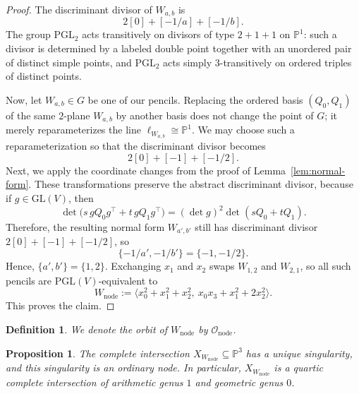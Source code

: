 \documentclass[11pt]{article}
\newtheorem{proposition}[theorem]{Proposition}
\newtheorem{definition}[theorem]{Definition}
\newcommand{\Pj}{\mathbb P}
\newcommand{\PGL}{\mathrm{PGL}}
\newcommand{\GL}{\mathrm{GL}}
\begin{document}
\begin{proof}
The discriminant divisor of $W_{a,b}$ is
\[
2[0]+[-1/a]+[-1/b].
\]
The group $\PGL_2$ acts transitively on divisors of type $2+1+1$ on $\Pj^1$: such a divisor is determined by a labeled double point together with an unordered pair of distinct simple points, and $\PGL_2$ acts simply $3$-transitively on ordered triples of distinct points.

Now, let $W_{a,b}\in G$ be one of our pencils. Replacing the ordered basis $(Q_0,Q_1)$ of the same $2$-plane $W_{a,b}$ by another basis does not change the point of $G$; it merely reparameterizes the line $\ell_{W_{a,b}}\cong \Pj^1$. We may choose such a reparameterization so that the discriminant divisor becomes
\[
2[0]+[-1]+[-1/2].
\]
Next, we apply the coordinate changes from the proof of Lemma~\ref{lem:normal-form}. These transformations preserve the abstract discriminant divisor, because if $g\in \GL(V)$, then
\[
\det\bigl(s\,gQ_0g^\top+t\,gQ_1g^\top\bigr)=(\det g)^2\det(sQ_0+tQ_1).
\]
Therefore, the resulting normal form $W_{a',b'}$ still has discriminant divisor $2[0]+[-1]+[-1/2]$, so
\[
\{-1/a',-1/b'\}=\{-1,-1/2\}.
\]
Hence, $\{a',b'\}=\{1,2\}$. Exchanging $x_1$ and $x_2$ swaps $W_{1,2}$ and $W_{2,1}$, so all such pencils are $\PGL(V)$-equivalent to
\[
W_{\mathrm{node}}:=\big\langle x_0^2+x_1^2+x_2^2,\ x_0x_3+x_1^2+2x_2^2\big\rangle.
\]
This proves the claim.
\end{proof}

\begin{definition}
We denote the orbit of $W_{\mathrm{node}}$ by $\mathcal O_{\mathrm{node}}$.
\end{definition}

\begin{proposition}\label{prop:nodal-model}
The complete intersection $X_{W_{\mathrm{node}}}\subseteq \Pj^3$ has a unique singularity, and this singularity is an ordinary node. In particular, $X_{W_{\mathrm{node}}}$ is a quartic complete intersection of arithmetic genus $1$ and geometric genus $0$.
\end{proposition}
\end{document}
